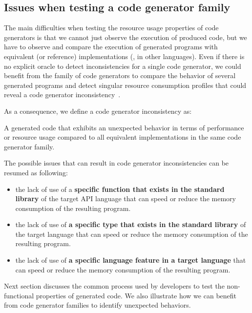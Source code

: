 \subsection{Issues when testing a code generator family}

The main difficulties when testing the resource usage properties of code generators is that we cannot just observe the execution of produced code, but we have to observe and compare the execution of generated programs with equivalent (or reference) implementations (\ie, in other languages). Even if there is no explicit oracle to detect inconsistencies for a single code generator, we could benefit from the family of code generators to compare the behavior of several generated programs and detect singular resource consumption profiles that could reveal a code generator inconsistency~\cite{hundt2011loop}. 

As a consequence, we define a code generator inconsistency as:

\begin{mydef}
	
	A generated code that exhibits an unexpected behavior in terms of performance or resource usage compared to all equivalent implementations in the same code generator family.
\end{mydef}

The possible issues that can result in code generator inconsistencies can be resumed as following:
\begin{itemize}
	\setlength\itemsep{0em}
	\item  the lack of use of a \textbf{specific function that exists in the standard library} of the target API language  that can speed or reduce the memory consumption of the resulting program.
	\item the lack of use of \textbf{a specific type that exists in the standard library} of the target language  that can speed or reduce the memory consumption of the resulting program.
	\item  the lack of use of\textbf{ a specific language feature in a target language} that can speed or reduce the memory consumption of the resulting program. 
\end{itemize}

Next section discusses the common process used by developers to test the non-functional properties of generated code. We also illustrate how we can benefit from code generator families to identify unexpected behaviors.


